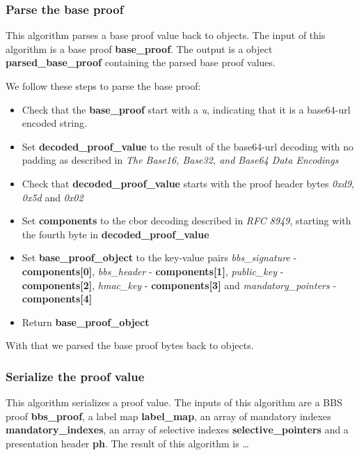 \documentclass[
	a4paper               %
	,bibliography=totoc   %
	,listof=totoc         %
	,monolingual
	twoside=false,
]{bfhthesis}              %
\begin{document}
\subsubsection{Parse the base proof}
\label{subsub:parsebaseproof}

This algorithm parses a base proof value back to objects.
The input of this algorithm is a base proof \textbf{base\_proof}.
The output is a object \textbf{parsed\_base\_proof} containing the parsed base proof values.

We follow these steps to parse the base proof:
\begin{itemize}
	\item Check that the \textbf{base\_proof} start with a \textit{u}, indicating that it is a base64-url encoded string.
	\item Set \textbf{decoded\_proof\_value} to the result of the base64-url decoding with no padding as described in \textit{The Base16, Base32, and Base64 Data Encodings}\cite{base64}
	\item Check that \textbf{decoded\_proof\_value} starts with the proof header bytes \textit{0xd9}, \textit{0x5d} and \textit{0x02}
	\item Set \textbf{components} to the cbor decoding described in \textit{RFC 8949}\cite{cbor}, starting with the fourth byte in \textbf{decoded\_proof\_value}
	\item Set \textbf{base\_proof\_object} to the key-value pairs \textit{bbs\_signature} - \textbf{components[0]}, \textit{bbs\_header} - \textbf{components[1]}, \textit{public\_key} - \textbf{components[2]}, \textit{hmac\_key} - \textbf{components[3]} and \textit{mandatory\_pointers} - \textbf{components[4]}
	\item Return \textbf{base\_proof\_object}
\end{itemize}

With that we parsed the base proof bytes back to objects.

\subsubsection{Serialize the proof value}
\label{subsub:serializebaseproof}

This algorithm serializes a proof value.
The inputs of this algorithm are a BBS proof \textbf{bbs\_proof}, a label map \textbf{label\_map}, an array of mandatory indexes \textbf{mandatory\_indexes}, an array of selective indexes \textbf{selective\_pointers} and a presentation header \textbf{ph}.
The result of this algorithm is \dots
\end{document}
